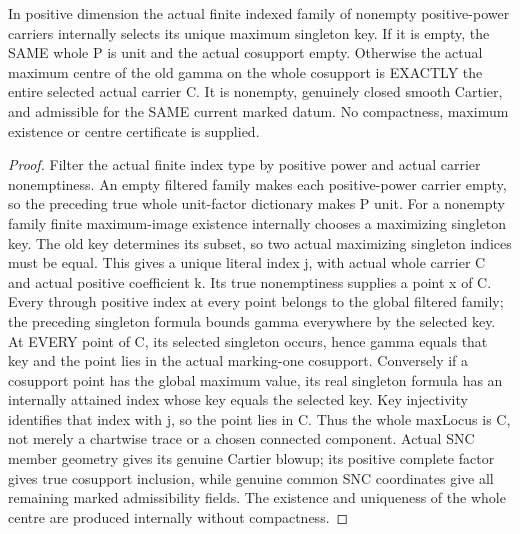 \begin{theorem}
\label{hir:nc-ordered-tail-actual-global-singleton-centre}
\leanok
In positive dimension the actual finite indexed family of nonempty positive-power carriers
internally selects its unique maximum singleton key. If it is empty, the
SAME whole P is unit and the actual cosupport empty. Otherwise the actual
maximum centre of the old gamma on the whole cosupport is EXACTLY the entire
selected actual carrier C. It is nonempty, genuinely closed smooth Cartier,
and admissible for the SAME current marked datum. No compactness, maximum
existence or centre certificate is supplied.
\end{theorem}
\begin{proof}
Filter the actual finite index type by positive power and actual carrier
nonemptiness. An empty filtered family makes each positive-power carrier
empty, so the preceding true whole unit-factor dictionary makes P unit.
For a nonempty family finite maximum-image existence internally chooses a
maximizing singleton key. The old key determines its subset, so two actual
maximizing singleton indices must be equal. This gives a unique literal
index j, with actual whole carrier C and actual positive coefficient k.
Its true nonemptiness supplies a point x of C. Every through positive index
at every point belongs to the global filtered family; the preceding singleton
formula bounds gamma everywhere by the selected key. At EVERY point of C,
its selected singleton occurs, hence gamma equals that key and the point
lies in the actual marking-one cosupport. Conversely if a cosupport point
has the global maximum value, its real singleton formula has an internally
attained index whose key equals the selected key. Key injectivity identifies
that index with j, so the point lies in C. Thus the whole maxLocus is C,
not merely a chartwise trace or a chosen connected component. Actual SNC
member geometry gives its genuine Cartier blowup; its positive complete
factor gives true cosupport inclusion, while genuine common SNC coordinates
give all remaining marked admissibility fields. The existence and uniqueness
of the whole centre are produced internally without compactness.
\end{proof}

